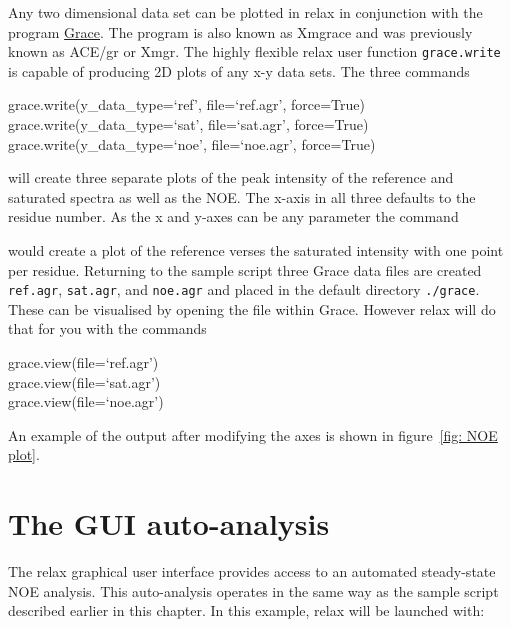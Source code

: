 Any two dimensional data set can be plotted in relax in conjunction with the program \href{http://plasma-gate.weizmann.ac.il/Grace/}{Grace}.  The program is also known as Xmgrace and was previously known as ACE/gr or Xmgr.  The highly flexible relax user function \texttt{grace.write} is capable of producing 2D plots of any x-y data sets.  The three commands

\begin{exampleenv}
grace.write(y\_data\_type=`ref', file=`ref.agr', force=True) \\
grace.write(y\_data\_type=`sat', file=`sat.agr', force=True) \\
grace.write(y\_data\_type=`noe', file=`noe.agr', force=True)
\end{exampleenv}

will create three separate plots of the peak intensity of the reference and saturated spectra as well as the NOE.  The x-axis in all three defaults to the residue number.  As the x and y-axes can be any parameter the command


would create a plot of the reference verses the saturated intensity with one point per residue.  Returning to the sample script three Grace data files are created \texttt{ref.agr}, \texttt{sat.agr}, and \texttt{noe.agr} and placed in the default directory \texttt{./grace}.  These can be visualised by opening the file within Grace.  However relax will do that for you with the commands

\begin{exampleenv}
grace.view(file=`ref.agr') \\
grace.view(file=`sat.agr') \\
grace.view(file=`noe.agr')
\end{exampleenv}

An example of the output after modifying the axes is shown in figure~\ref{fig: NOE plot}.



\newpage
\section{The GUI auto-analysis}

The relax graphical user interface provides access to an automated steady-state NOE analysis.  This auto-analysis operates in the same way as the sample script described earlier in this chapter.  In this example, relax will be launched with:

